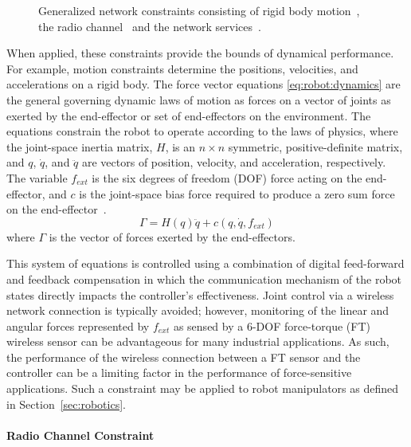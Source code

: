 \documentclass[journal, twoside]{IEEEtran}
\begin{document}
\begin{figure}[tbp]
{		}  
		\caption{Generalized network constraints consisting of rigid body motion~\protect{}, the radio channel~\protect{} and the network services~\protect{}.}
		\label{fig:general:constraints}      
	\end{figure}
	
	When applied, these constraints provide the bounds of dynamical performance.  For example, motion constraints determine the positions, velocities, and accelerations on a rigid body.  The force vector equations \eqref{eq:robot:dynamics} are the general governing dynamic laws of motion as forces on a vector of joints as exerted by the end-effector or set of end-effectors on the environment.  The equations constrain the robot to operate according to the laws of physics, where the joint-space inertia matrix, $H$, is an ${n}\times{n}$ symmetric, positive-definite matrix, and $q$, $\dot{q}$, and $\ddot{q}$ are vectors of position, velocity, and acceleration, respectively.  The variable $f_{ext}$ is the six degrees of freedom (DOF) force acting on the end-effector, and $c$ is the joint-space bias force required to produce a zero sum force on the end-effector~\cite{Featherstone2007}.  
	\begin{equation}
	\label{eq:robot:dynamics}
	\Gamma = H(q) \ddot{q} + c(q,\dot{q},f_{\!ext})
	\end{equation}    
 where $\Gamma$ is the vector of forces exerted by the end-effectors.  
    
	This system of equations is controlled using a combination of digital feed-forward and feedback compensation in which the communication mechanism of the robot states directly impacts the controller's effectiveness. Joint control via a wireless network connection is typically avoided; however, monitoring of the linear and angular forces represented by $f_{\!ext}$ as sensed by a 6-DOF force-torque (FT) wireless sensor can be advantageous for many industrial applications.  As such, the performance of the wireless connection between a FT sensor and the controller can be a limiting factor in the performance of force-sensitive applications. Such a constraint may be applied to robot manipulators as defined in Section~\ref{sec:robotics}.
	
	\paragraph{Radio Channel Constraint}\label{sec:constraints:radio}
	
\end{document}
